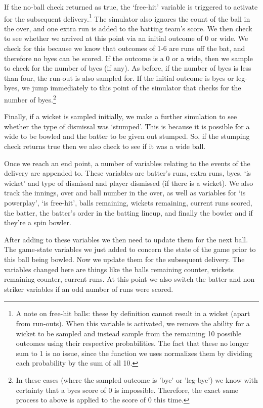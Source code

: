 If the no-ball check returned as true, the ‘free-hit’ variable is triggered to activate for the subsequent delivery.\footnote{A note on free-hit balls: these by definition cannot result in a wicket (apart from run-outs). When this variable is activated, we remove the ability for a wicket to be sampled and instead sample from the remaining 10 possible outcomes using their respective probabilities. The fact that these no longer sum to 1 is no issue, since the function we uses normalizes them by dividing each probability by the sum of all 10.} The simulator also ignores the count of the ball in the over, and one extra run is added to the batting team’s score. We then check to see whether we arrived at this point via an initial outcome of 0 or wide. We check for this because we know that outcomes of 1-6 are runs off the bat, and therefore no byes can be scored. If the outcome is a 0 or a wide, then we sample to check for the number of byes (if any). As before, if the number of byes is less than four, the run-out is also sampled for. If the initial outcome is byes or leg-byes, we jump immediately to this point of the simulator that checks for the number of byes.\footnote{In these cases (where the sampled outcome is 'bye' or 'leg-bye') we know with certainty that a byes score of 0 is impossible. Therefore, the exact same process to above is applied to the score of 0 this time.}

Finally, if a wicket is sampled initially, we make a further simulation to see whether the type of dismissal was ‘stumped’. This is because it is possible for a wide to be bowled and the batter to be given out stumped. So, if the stumping check returns true then we also check to see if it was a wide ball.

Once we reach an end point, a number of variables relating to the events of the delivery are appended to. These variables are batter's runs, extra runs, byes, `is wicket' and type of dismissal and player dismissed (if there is a wicket). We also track the innings, over and ball number in the over, as well as variables for `is powerplay', `is free-hit', balls remaining, wickets remaining, current runs scored, the batter, the batter's order in the batting lineup, and finally the bowler and if they're a spin bowler.

After adding to these variables we then need to update them for the next ball. The game-state variables we just added to concern the state of the game prior to this ball being bowled. Now we update them for the subsequent delivery. The variables changed here are things like the balls remaining counter, wickets remaining counter, current runs. At this point we also switch the batter and non-striker variables if an odd number of runs were scored.

